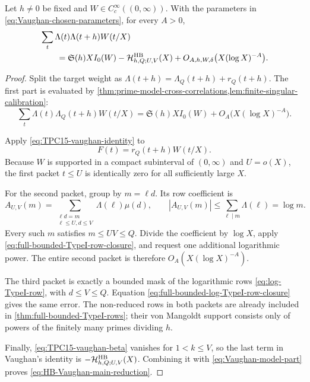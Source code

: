 \begin{theorem}
\label{thm:HB-Vaughan-reduction}
Let $h\ne0$ be fixed and $W\in C_c^\infty((0,\infty))$.  With the
parameters in \eqref{eq:Vaughan-chosen-parameters}, for every $A>0$,
\begin{align}
 &\sum_t\Lambda(t)\Lambda(t+h)W(t/X)
 \notag\\
 &\qquad={}
 \mathfrak S(h)XI_0(W)
 -\mathcal H^{\rm HB}_{h,Q;U,V}(X)
 +O_{A,h,W,\delta}\bigl(X(\log X)^{-A}\bigr).
 \label{eq:HB-Vaughan-main-reduction}
\end{align}
\end{theorem}

\begin{proof}
Split the target weight as $\Lambda(t+h)=\Lambda_Q(t+h)+r_Q(t+h)$.
The first part is evaluated by
\cref{thm:prime-model-cross-correlations,lem:finite-singular-calibration}:
\begin{equation}
 \sum_t\Lambda(t)\Lambda_Q(t+h)W(t/X)
 =\mathfrak S(h)XI_0(W)
 +O_A\bigl(X(\log X)^{-A}\bigr).
 \label{eq:Vaughan-model-part}
\end{equation}

Apply \eqref{eq:TPC15-vaughan-identity} to
\begin{equation}
 F(t)=r_Q(t+h)W(t/X).
 \label{eq:Vaughan-residual-test}
\end{equation}
Because $W$ is supported in a compact subinterval of $(0,\infty)$ and
$U=o(X)$, the first packet $t\leq U$ is identically zero for all
sufficiently large $X$.

For the second packet, group by $m=\ell d$.  Its row coefficient is
\begin{equation}
 A_{U,V}(m)=
 \sum_{\substack{\ell d=m\\\ell\leq U, d\leq V}}
 \Lambda(\ell)\mu(d),
 \qquad
 |A_{U,V}(m)|\leq\sum_{\ell\mid m}\Lambda(\ell)=\log m.
 \label{eq:Vaughan-TypeI-row-coefficient}
\end{equation}
Every such $m$ satisfies $m\leq UV\leq Q$.  Divide the coefficient by
$\log X$, apply \eqref{eq:full-bounded-TypeI-row-closure}, and request one
additional logarithmic power.  The entire second packet is therefore
$O_A(X(\log X)^{-A})$.

The third packet is exactly a bounded mask of the logarithmic rows
\eqref{eq:log-TypeI-row}, with $d\leq V\leq Q$.  Equation
\eqref{eq:full-bounded-log-TypeI-row-closure} gives the same error.  The
non-reduced rows in both packets are already included in
\cref{thm:full-bounded-TypeI-rows}; their von Mangoldt support consists
only of powers of the finitely many primes dividing $h$.

Finally, \eqref{eq:TPC15-vaughan-beta} vanishes for $1<k\leq V$, so the
last term in Vaughan's identity is
$-\mathcal H^{\rm HB}_{h,Q;U,V}(X)$.  Combining it with
\eqref{eq:Vaughan-model-part} proves
\eqref{eq:HB-Vaughan-main-reduction}.
\end{proof}

